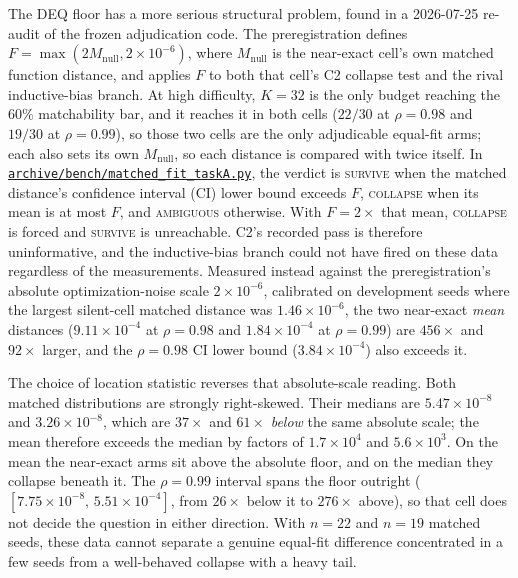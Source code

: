 The DEQ floor has a more serious structural problem, found in a 2026-07-25
re-audit of the frozen adjudication code. The preregistration defines
$F=\max(2M_{\mathrm{null}},2\times10^{-6})$, where
$M_{\mathrm{null}}$ is the near-exact cell's own matched function distance,
and applies $F$ to both that cell's C2 collapse test and the rival
inductive-bias branch. At high difficulty, $K=32$ is the only budget reaching
the $60\%$ matchability bar, and it reaches it in both cells ($22/30$ at
$\rho=0.98$ and $19/30$ at $\rho=0.99$), so those two cells are the only
adjudicable equal-fit arms; each also sets its own $M_{\mathrm{null}}$, so each
distance is compared with twice itself.
In
\href{https://github.com/vanshsehrawat14/gabp-sparse-inv/blob/main/archive/bench/matched_fit_taskA.py}
{\nolinkurl{archive/bench/matched_fit_taskA.py}}, the verdict is \textsc{survive} when
the matched distance's confidence interval (CI) lower bound exceeds $F$,
\textsc{collapse} when its mean is at most $F$, and \textsc{ambiguous}
otherwise. With $F=2\times$ that mean, \textsc{collapse} is forced and
\textsc{survive} is unreachable. C2's recorded pass is therefore
uninformative, and the inductive-bias branch could not have fired on these
data regardless of the measurements. Measured instead against the
preregistration's absolute optimization-noise scale $2\times10^{-6}$,
calibrated on development seeds where the largest silent-cell matched distance
was $1.46\times10^{-6}$, the two near-exact \emph{mean} distances
($9.11\times10^{-4}$ at $\rho=0.98$ and $1.84\times10^{-4}$ at $\rho=0.99$)
are $456\times$ and $92\times$ larger, and the $\rho=0.98$ CI lower bound
($3.84\times10^{-4}$) also exceeds it.

The choice of location statistic reverses that absolute-scale reading. Both
matched distributions are strongly right-skewed. Their medians are
$5.47\times10^{-8}$ and $3.26\times10^{-8}$, which are $37\times$ and
$61\times$ \emph{below} the same absolute scale; the mean therefore exceeds
the median by factors of $1.7\times10^{4}$ and $5.6\times10^{3}$. On the mean
the near-exact arms sit above the absolute floor, and on the median they
collapse beneath it. The $\rho=0.99$ interval spans the floor outright
($[7.75\times10^{-8},\,5.51\times10^{-4}]$, from $26\times$ below it to
$276\times$ above), so that cell does not decide the question in either
direction. With $n=22$ and $n=19$ matched seeds, these data cannot separate a
genuine equal-fit difference concentrated in a few seeds from a well-behaved
collapse with a heavy tail.

